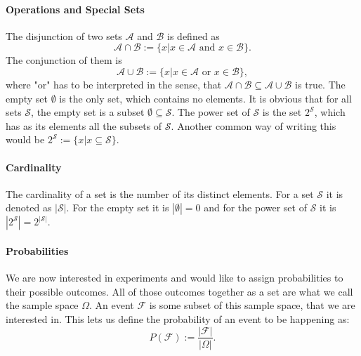 \paragraph*{Operations and Special Sets}
The disjunction of two sets $\mathcal{A}$ and $\mathcal{B}$ is defined as 
\begin{equation}
\mathcal{A}\cap\mathcal{B}:=\{x|x\in \mathcal{A}\text{ and }x\in \mathcal{B}\}.
\end{equation}
The conjunction of them is 
\begin{equation}
\mathcal{A}\cup\mathcal{B}:=\{x|x\in \mathcal{A}\text{ or }x\in \mathcal{B}\},
\end{equation}
where "or" has to be interpreted in the sense, that $\mathcal{A}\cap\mathcal{B}\subseteq\mathcal{A}\cup\mathcal{B}$ is true. The empty set $\emptyset$ is the only set, which contains no elements. It is obvious that for all sets $\mathcal{S}$, the empty set is a subset $\emptyset\subseteq\mathcal{S}$. The power set of $\mathcal{S}$ is the set $2^\mathcal{S}$, which has as its elements all the subsets of $\mathcal{S}$. Another common way of writing this would be $2^\mathcal{S}:=\{x|x\subseteq \mathcal{S}\}$.

\paragraph*{Cardinality}
The cardinality of a set is the number of its distinct elements. For a set $\mathcal{S}$ it is denoted as $|\mathcal{S}|$. For the empty set it is $|\emptyset| = 0$ and for the power set of $\mathcal{S}$ it is $|2^\mathcal{S}|=2^{|\mathcal{S}|}$.

\paragraph*{Probabilities}
We are now interested in experiments and would like to assign probabilities to their possible outcomes. All of those outcomes together as a set are what we call the sample space $\Omega$. An event $\mathcal{F}$ is some subset of this sample space, that we are interested in. This lets us define the probability of an event to be happening as:
\begin{equation}
P(\mathcal{F}) := \frac{|\mathcal{F}|}{|\Omega|}.
\end{equation}

